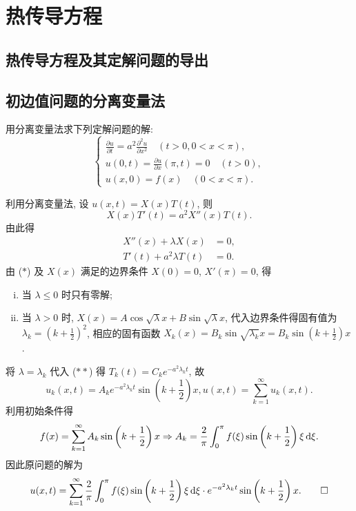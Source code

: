 \chapter{热传导方程}

\section{热传导方程及其定解问题的导出}

\section{初边值问题的分离变量法}


\begin{exercise}
  用分离变量法求下列定解问题的解:
  \[\begin{cases}
    \frac{\partial u}{\partial t} = a^2 \frac{\partial^2u}{\partial x^2}
      \quad (t>0, 0<x<\pi), \\
    u(0,t) = \frac{\partial u}{\partial x}(\pi,t) = 0\quad (t>0), \\
    u(x,0) = f(x)\quad (0<x<\pi).
  \end{cases}\]
\end{exercise}

\begin{solution}
  利用分离变量法, 设 $u(x,t)=X(x)T(t)$, 则
  \[X(x)T'(t) = a^2X''(x)T(t).\]
  由此得
  \begin{align}
    X''(x)+\lambda X(x) & = 0, \tag{$*$} \\
    T'(t)+a^2\lambda T(t) & = 0. \tag{$**$} 
  \end{align}
  由 ($*$) 及 $X(x)$ 满足的边界条件 $X(0)=0$, $X'(\pi)=0$, 得
  \begin{enumerate}[(i)]
    \item 当 $\lambda\leq 0$ 时只有零解;
    \item 当 $\lambda>0$ 时, $X(x)=A\cos\sqrt{\lambda}x+B\sin\sqrt{\lambda}x$,
      代入边界条件得固有值为 $\lambda_k=\left(k+\frac{1}{2}\right)^2$,
      相应的固有函数 $X_k(x)=B_k\sin\sqrt{\lambda_k}x=B_k\sin\left(k+\frac{1}{2}\right)x$.
  \end{enumerate}
  将 $\lambda=\lambda_k$ 代入 ($**$) 得 $T_k(t)=C_ke^{-a^2\lambda_kt}$, 故
  \[u_k(x,t) = A_ke^{-a^2\lambda_kt}\sin\left(k+\frac{1}{2}\right)x,u(x,t)
    = \sum_{k=1}^{\infty}u_k(x,t).\]
  利用初始条件得
  \[f(x) = \sum_{k=1}^{\infty}A_k\sin\left(k+\frac{1}{2}\right)x\Rightarrow A_k
    = \frac{2}{\pi}\int_0^{\pi}f(\xi)\sin\left(k+\frac{1}{2}\right)\xi\mathop{}\!\mathrm{d}\xi.\]
  因此原问题的解为
  \[u(x,t) = \sum_{k=1}^{\infty}\frac{2}{\pi}\int_0^{\pi} f(\xi)\sin\left(k+\frac{1}{2}\right)
    \xi\mathop{}\!\mathrm{d}\xi\cdot e^{-a^2\lambda_kt}\sin\left(k+\frac{1}{2}\right)x. \qedhere\]
\end{solution}


